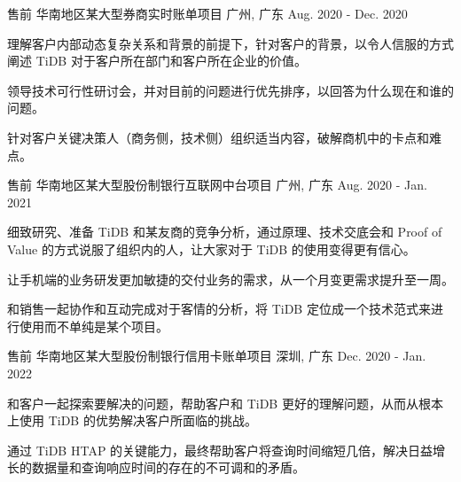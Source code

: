 \begin{cventries}
  \cventry
    { 售前 } %
    {华南地区某大型券商实时账单项目} %
    {广州, 广东} %
    {Aug. 2020 - Dec. 2020} %
    {
	\begin{cvitems} %
        \item {理解客户内部动态复杂关系和背景的前提下，针对客户的背景，以令人信服的方式阐述 TiDB 对于客户所在部门和客户所在企业的价值。}
        \item {领导技术可行性研讨会，并对目前的问题进行优先排序，以回答为什么现在和谁的问题。 }
        \item {针对客户关键决策人（商务侧，技术侧）组织适当内容，破解商机中的卡点和难点。}
      \end{cvitems}
    }

\cventry
    { 售前} %
    {华南地区某大型股份制银行互联网中台项目} %
    {广州, 广东} %
    {Aug. 2020 - Jan. 2021} %
    {
      \begin{cvitems} %
        \item {细致研究、准备 TiDB 和某友商的竞争分析，通过原理、技术交底会和 Proof of Value 的方式说服了组织内的人，让大家对于 TiDB 的使用变得更有信心。}
        \item {让手机端的业务研发更加敏捷的交付业务的需求，从一个月变更需求提升至一周。}
        \item {和销售一起协作和互动完成对于客情的分析，将 TiDB 定位成一个技术范式来进行使用而不单纯是某个项目。}
      \end{cvitems}
    }

\cventry
    { 售前 } %
    {华南地区某大型股份制银行信用卡账单项目} %
    {深圳, 广东} %
    {Dec. 2020 - Jan. 2022} %
    {
      \begin{cvitems} %
        \item {和客户一起探索要解决的问题，帮助客户和 TiDB 更好的理解问题，从而从根本上使用 TiDB 的优势解决客户所面临的挑战。}
        \item {通过 TiDB HTAP 的关键能力，最终帮助客户将查询时间缩短几倍，解决日益增长的数据量和查询响应时间的存在的不可调和的矛盾。}
      \end{cvitems}
    }


\end{cventries}
